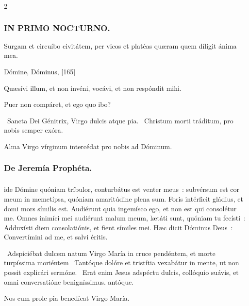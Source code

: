 \documentclass[9pt,twoside]{extarticle}
\begin{document}
\begin{multicols}{2}
\subsubsection*{\center \textsc{IN PRIMO NOCTURNO.}}
\begin{tightlist}{}
\item {} Surgam et circuíbo civitátem, per vicos et platéas quæram quem díligit ánima mea.
\item {} Dómine, Dóminus,  [165]
\item {} Quæsívi illum, et non invéni, vocávi, et non respóndit mihi.
\item {} Puer non compáret, et ego quo ibo?
\item {}~Sancta Dei Génitrix, Virgo dulcis atque pia. ~Christum morti tráditum, pro nobis semper exóra.
\item {}
\item {\small {} Alma Virgo vírginum intercédat pro nobis ad Dóminum.}
\end{tightlist}

\subsubsection*{\center De Jeremía Prophéta.}
\subsubsection*{\center {}}
ide Dómine quóniam tríbulor, conturbátus est venter meus~: subvérsum est cor meum in memetípsa, quóniam amaritúdine plena sum. Foris intérficit gládius, et domi mors símilis est.
Audiérunt quia ingemísco ego, et non est qui consolétur me. Omnes inimíci mei audiérunt malum meum, lætáti sunt, quóniam tu fecísti~: Adduxísti diem consolatiónis, et fient símiles mei. Hæc dicit Dóminus Deus~: Convertímini ad me, et salvi éritis.

\begin{tightlist}{}
\item {}~Adspiciébat dulcem natum Virgo María in cruce pendéntem, et morte turpíssima moriéntem \textred{*}~Tantóque dolóre et tristítia vexabátur in mente, ut non possit explicári sermóne. ~Erat enim Jesus adspéctu dulcis, collóquio suávis, et omni conversatióne benigníssimus. antóque.
\item {\small {} Nos cum prole pia benedícat Virgo María.}
\end{tightlist}


\end{multicols}
\end{document}
